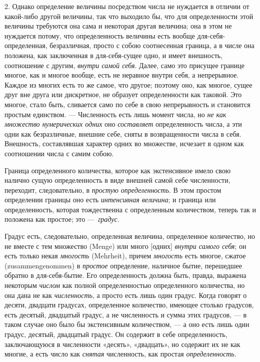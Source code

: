 {2. Однако определение величины посредством числа не нуждается в отличии от
какой-либо другой величины, так что выходило бы, что для определенности
этой величины требуются она сама и некоторая другая величина; она в этом не
нуждается потому, что определенность величины есть вообще
для-себя-определенная, безразличная, просто с собою соотнесенная граница, а
в числе она положена, как заключенная в для-себя-сущее одно, и имеет
внешность, соотношение с другим, {\em внутри самой
себя}. Далее, само это присущее границе многое, как и многое вообще, есть
не неравное внутри себя, а непрерывное. Каждое из многих есть то же самое,
что другое; поэтому оно, как многое, сущее друг вне друга или дискретное,
не образует определенности как таковой. Это многое, стало быть, сливается
само по себе в свою непрерывность и становится простым единством. —
Численность есть лишь момент числа, но {\em не как
множество нумерических одних} оно {\em составляет}
определенность числа, а эти одни как безразличные, внешние себе, сняты в
возвращенности числа в себя. Внешность, составлявшая характер одних во
множестве, исчезает в одном как соотношении числа с самим собою.

Граница определенного количества, которое как экстенсивное имело свою
налично сущую определенность в виде внешней самой себе численности,
переходит, следовательно, в {\em простую
определенность}. В этом простом определении границы оно есть
{\em интенсивная величина}; и граница или
определенность, которая тождественна с определенным количеством, теперь так
и положена как простое; это —~{\em градус}.

Градус есть, следовательно, определенная величина, определенное количество,
но не вместе с тем множество (Menge) или много [одних]
{\em внутри самого себя}; он есть только некая
{\em многость} (Mehrheit), причем
{\em многость} есть многое, сжатое (zusammengenommen) в
{\em простое} определение, наличное бытие, перешедшее
обратно в для-себя-бытие. Его определенность должна быть, правда, выражена
некоторым {\em числом} как полной определенностью
определенного количества, но она дана не как
{\em численность}, а просто есть лишь один градус.
Когда говорят о десяти, двадцати градусах, определенное количество, имеющее
столько градусов, есть десятый, двадцатый градус, а не численность и сумма
этих градусов, — в таком случае оно было бы экстенсивным количеством, — а
оно есть лишь один градус, десятый, двадцатый градус. Он содержит в себе
определенность, заключающуюся в численности «десять», «двадцать», но
содержит их не как многие, а есть число как
{\em снятая} численность, как простая
{\em определенность}.

}

